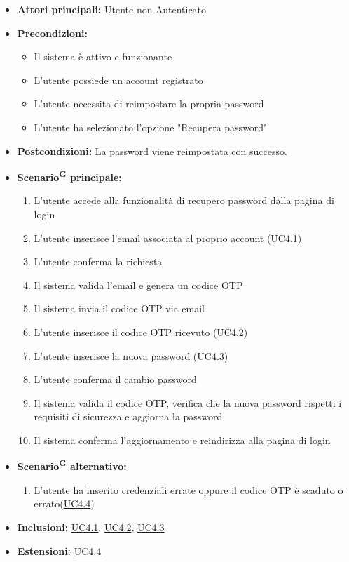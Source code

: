 \documentclass[a4paper, 11pt]{article}
\begin{document}
\begin{itemize}
	\item \textbf{Attori principali:} Utente non Autenticato
	\item \textbf{Precondizioni:}
	\begin{itemize}
		\item Il sistema è attivo e funzionante
		\item L'utente possiede un account registrato
		\item L'utente necessita di reimpostare la propria password
        \item L'utente ha selezionato l'opzione "Recupera password"
	\end{itemize}
	\item \textbf{Postcondizioni:} La password viene reimpostata con successo.
	\item \textbf{Scenario\textsuperscript{G} principale:}
	\begin{enumerate}
		\item L'utente accede alla funzionalità di recupero password dalla pagina di login
		\item L'utente inserisce l'email associata al proprio account (\hyperref[UC4.1]{UC4.1})
		\item L'utente conferma la richiesta
		\item Il sistema valida l'email e genera un codice OTP
		\item Il sistema invia il codice OTP via email
		\item L'utente inserisce il codice OTP ricevuto (\hyperref[UC4.2]{UC4.2})
		\item L'utente inserisce la nuova password (\hyperref[UC4.3]{UC4.3})
		\item L'utente conferma il cambio password
		\item Il sistema valida il codice OTP, verifica che la nuova password rispetti i requisiti di sicurezza e aggiorna la password
		\item Il sistema conferma l'aggiornamento e reindirizza alla pagina di login
	\end{enumerate}
	\item \textbf{Scenario\textsuperscript{G} alternativo:}
	\begin{enumerate}
		\item L'utente ha inserito credenziali errate oppure il codice OTP è scaduto o errato(\hyperref[UC4.4]{UC4.4})
	\end{enumerate}
	\item \textbf{Inclusioni:} \hyperref[UC4.1]{UC4.1}, \hyperref[UC4.2]{UC4.2}, \hyperref[UC4.3]{UC4.3}
	\item \textbf{Estensioni:} \hyperref[UC4.4]{UC4.4}
\end{itemize}
\end{document}
